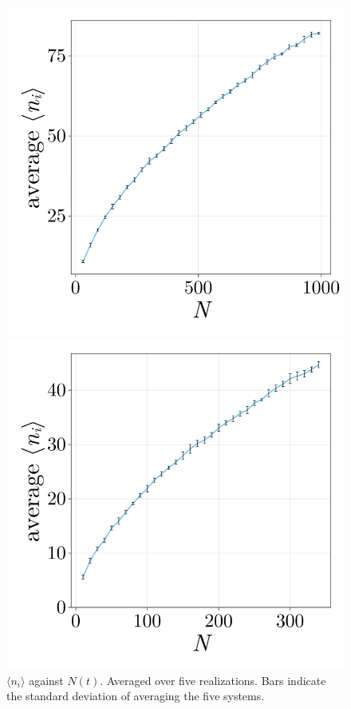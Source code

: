 \begin{figure}[ht]
    \centering
    \begin{minipage}{0.45\textwidth}
        \centering
        \includegraphics[width=\textwidth]{figures/301/301-ncells-vs-ni-1000.png}
    \end{minipage}
    \hspace{0.5cm}
    \begin{minipage}{0.45\textwidth}
        \centering
        \includegraphics[width=\textwidth]{figures/301/301-ncells-vs-ni-300.png}
    \end{minipage}
    \caption{$\langle n_i\rangle$ against $N(t)$. Averaged over five realizations. Bars indicate the standard deviation of averaging the five systems.}
    \label{fig:avg_ncells_vs_ni}
\end{figure}



